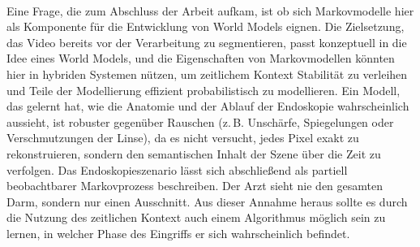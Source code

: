 \\
Eine Frage, die zum Abschluss der Arbeit aufkam, ist ob sich Markovmodelle hier als Komponente für die Entwicklung von World Models eignen. Die Zielsetzung, das Video bereits vor der Verarbeitung zu segmentieren, passt konzeptuell in die Idee eines World Models, und die Eigenschaften von Markovmodellen könnten hier in hybriden Systemen nützen, um zeitlichem Kontext Stabilität zu verleihen und Teile der Modellierung effizient probabilistisch zu modellieren. Ein Modell, das gelernt hat, wie die Anatomie und der Ablauf der Endoskopie wahrscheinlich aussieht, ist robuster gegenüber Rauschen (z.\,B. Unschärfe, Spiegelungen oder Verschmutzungen der Linse), da es nicht versucht, jedes Pixel exakt zu rekonstruieren, sondern den semantischen Inhalt der Szene über die Zeit zu verfolgen. Das Endoskopieszenario lässt sich abschließend als partiell beobachtbarer Markovprozess beschreiben. Der Arzt sieht nie den gesamten Darm, sondern nur einen Ausschnitt. Aus dieser Annahme heraus sollte es durch die Nutzung des zeitlichen Kontext auch einem Algorithmus möglich sein zu lernen, in welcher Phase des Eingriffs er sich wahrscheinlich befindet.

